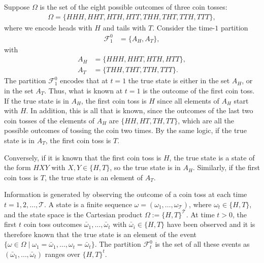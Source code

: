 \documentclass[\topdir/lecture\_notes.tex]{subfiles}
\begin{document}
\begin{example}\label{ex:three_coin_tosses}
Suppose $\Omega$ is the set of the eight possible outcomes of three coin tosses:
\begin{align*}
\Omega=\{H H H, H H T, H T H, H T T, T H H, T H T, T T H, T T T\},
\end{align*}
where we encode heads with $H$ and tails with $T$. Consider the time-$1$ partition
\begin{align*}
\mathcal{F}_{1}^{0}&=\{A_{H},A_{T}\},
\end{align*}
with%
\begin{align*}
A_{H}&=\{H H H, H H T, H T H, H T T\},\\
A_{T}&=\{T H H, T H T, T T H, T T T\}.
\end{align*}
The partition $\mathcal{F}_{1}^{0}$ encodes that at $t=1$ the true state is either in the set $A_{H}$, or in the set $A_{T}$. Thus, what is known at $t=1$ is the outcome of the first coin toss. If the true state is in $A_{H}$, the first coin toss is $H$ since all elements of $A_{H}$ start with $H$. In addition, this is all that is known, since the outcomes of the last two coin tosses of the elements of $A_{H}$ are $\{H H, H T, T H, T T\}$, which are all the possible outcomes of tossing the coin two times. By the same logic, if the true state is in $A_{T}$, the first coin toss is $T$.

Conversely, if it is known that the first coin toss is $H$, the true state is a state of the form $H X Y$ with $X,Y\in \{H,T\}$, so the true state is in $A_{H}$. Similarly, if the first coin toss is $T$, the true state is an element of $A_{T}$.
\end{example}

\begin{example}\label{ex:coin_toss}
Information is generated by observing the outcome of a coin toss at each time $t=1,2, \ldots, \mathcal{T}$. A state is a finite sequence $\omega=(\omega_{1}, \ldots, \omega_{\mathcal{T}})$, where $\omega_{t} \in\{H, T\}$, and the state space is the Cartesian product $\Omega := \{H, T\}^{\mathcal{T}}$. At time $t>0$, the first $t$ coin toss outcomes $\bar{\omega}_{1}, \ldots, \bar{\omega}_{t}$ with $\bar{\omega}_{i} \in \{H, T\}$ have been observed and it is therefore known that the true state is an element of the event $\{\omega \in \Omega \mid \omega_{1}=\bar{\omega}_{1}, \ldots, \omega_{t}=\bar{\omega}_{t}\}$. The partition $\mathcal{F}_{t}^{0}$ is the set of all these events as $(\bar{\omega}_{1}, \ldots, \bar{\omega}_{t})$ ranges over $\{H, T\}^{t}$.
\end{example}
\end{document}
